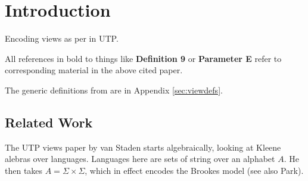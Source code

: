 \section{Introduction}

Encoding views as per \cite{conf/popl/Dinsdale-YoungBGPY13}
in UTP.

All references in bold to things
like \textbf{Definition 9} or \textbf{Parameter E} refer to corresponding material
in the above cited paper.

The generic definitions from\cite{conf/popl/Dinsdale-YoungBGPY13}
are in Appendix \ref{sec:viewdefs}.


\subsection{Related Work}

The UTP views paper by van Staden\cite{DBLP:conf/utp/Staden14}
starts algebraically, looking at Kleene alebras over languages.
Languages here are sets of string over an alphabet $A$.
He then takes $A =\Sigma\times\Sigma$,
which in effect encodes the Brookes model\cite{DBLP:journals/iandc/Brookes96}
(see also Park\cite{conf/ac/Park79}).
